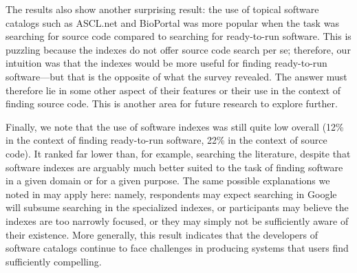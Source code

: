 \documentclass{casicswhitepaper}
\begin{document}
The results also show another surprising result: the use of topical software catalogs such as ASCL.net and BioPortal was more popular when the task was searching for source code compared to searching for ready-to-run software.  This is puzzling because the indexes do not offer source code search per se; therefore, our intuition was that the indexes would be more useful for finding ready-to-run software---but that is the opposite of what the survey revealed.  The answer must therefore lie in some other aspect of their features or their use in the context of finding source code. This is another area for future research to explore further.

Finally, we note that the use of software indexes was still quite low overall (12\% in the context of finding ready-to-run software, 22\% in the context of source code).  It ranked far lower than, for example, searching the literature, despite that software indexes are arguably much better suited to the task of finding software in a given domain or for a given purpose.  The same possible explanations we noted in  may apply here: namely, respondents may expect searching in Google will subsume searching in the specialized indexes, or participants may believe the indexes are too narrowly focused, or they may simply not be sufficiently aware of their existence.  More generally, this result indicates that the developers of software catalogs continue to face challenges in producing systems that users find sufficiently compelling.


\end{document}
